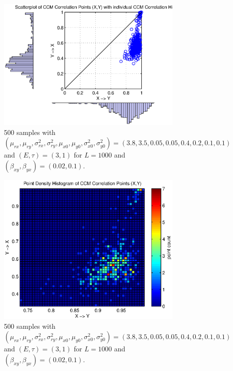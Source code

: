 \documentclass[a4paper,11pt]{article}
\begin{document}
\begin{figure}[h!t]
\centering
\begin{subfigure}[b]{0.4\textwidth}
\label{fig:SugEx1wCCMpoints_scatterhist}
\includegraphics[scale=0.55]{graphics/SugEx1wCCMpoints_scatterhist.eps}
\caption{500 samples with $\left(\mu_{rx},\mu_{ry},\sigma^2_{rx},\sigma^2_{ry},\mu_{x0},\mu_{y0},\sigma^2_{x0},\sigma^2_{y0}\right) = \left(3.8,3.5,0.05,0.05,0.4,0.2,0.1,0.1\right)$ and $\left(E,\tau\right)=\left(3,1\right)$ for $L=1000$ and $(\beta_{xy},\beta_{yx})=(0.02,0.1)$.}
\end{subfigure}
\begin{subfigure}[b]{0.4\textwidth}
\label{fig:SugEx1wCCMpoints_densityhist}
\includegraphics[scale=0.55]{graphics/SugEx1wCCMpoints_densityhist.eps}
\caption{500 samples with $\left(\mu_{rx},\mu_{ry},\sigma^2_{rx},\sigma^2_{ry},\mu_{x0},\mu_{y0},\sigma^2_{x0},\sigma^2_{y0}\right) = \left(3.8,3.5,0.05,0.05,0.4,0.2,0.1,0.1\right)$ and $\left(E,\tau\right)=\left(3,1\right)$ for $L=1000$ and $(\beta_{xy},\beta_{yx})=(0.02,0.1)$.}
\end{subfigure}
\caption{}
\end{figure}
\end{document}
